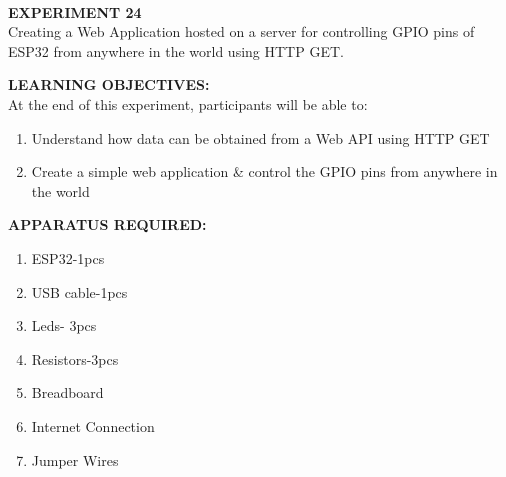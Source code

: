 \documentclass[12pt,a4paper]{article}
\begin{document}
\begin{center}
\textbf{\large \\EXPERIMENT 24 }\\[6pt]
Creating a Web Application hosted on a server for controlling  GPIO pins of ESP32 from anywhere in the world using HTTP GET.
\end{center}

\textbf{\large LEARNING OBJECTIVES:}\\[3pt]
At the end of this experiment, participants will be able to:\vspace{-6mm}\begin{enumerate}
 \setlength\itemsep{-0.3em}
\item Understand how data can be obtained from a Web API using HTTP GET
\item Create a simple web application \& control the GPIO pins from anywhere in the world
\end{enumerate}

\textbf{\large APPARATUS REQUIRED:}\\
\vspace{-3mm}
\begin{enumerate}
\setlength\itemsep{-0.3em}
\item ESP32-1pcs 
\item USB cable-1pcs
\item Leds- 3pcs
\item Resistors-3pcs
\item Breadboard
\item Internet Connection
\item Jumper Wires
\end{enumerate}
\end{document}
